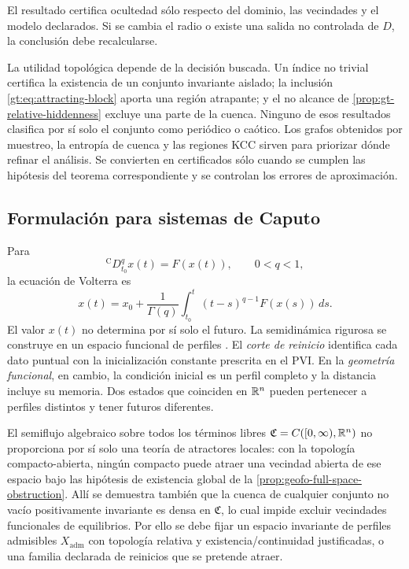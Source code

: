 El resultado certifica ocultedad sólo respecto del dominio, las vecindades y
el modelo declarados. Si se cambia el radio o existe una salida no controlada
de $D$, la conclusión debe recalcularse.

La utilidad topológica depende de la decisión buscada. Un índice no trivial
certifica la existencia de un conjunto invariante aislado; la inclusión
\eqref{gt:eq:attracting-block} aporta una región atrapante; y el no alcance de
\cref{prop:gt-relative-hiddenness} excluye una parte de la cuenca. Ninguno de
esos resultados clasifica por sí solo el conjunto como periódico o caótico.
Los grafos obtenidos por muestreo, la entropía de cuenca y las regiones KCC
sirven para priorizar dónde refinar el análisis. Se convierten en certificados
sólo cuando se cumplen las hipótesis del teorema correspondiente y se controlan
los errores de aproximación.
\fi

\subsection{Formulación para sistemas de Caputo}
\label{subsec:gt-caputo-transfer}

Para
\begin{equation}
 {}^{\mathrm C}D_{t_0}^{q}x(t)=F(x(t)),
 \qquad 0<q<1,
 \label{gt:eq:caputo}
\end{equation}
la ecuación de Volterra es
\begin{equation}
 x(t)=x_0+\frac1{\Gamma(q)}
 \int_{t_0}^{t}(t-s)^{q-1}F(x(s))\,ds.
 \label{gt:eq:caputo-volterra}
\end{equation}
El valor $x(t)$ no determina por sí solo el futuro. La semidinámica rigurosa se
construye en un espacio funcional de perfiles
\cite{CongTuan2017Nonlocal,DoanKloeden2021Semidynamical,
DoanKloeden2024Attractors}. El \emph{corte de reinicio} identifica cada dato puntual con la
inicialización constante prescrita en el PVI. En la \emph{geometría
funcional}, en cambio, la condición inicial es un perfil completo y la
distancia incluye su memoria. Dos estados que coinciden en \(\mathbb{R}^n\) pueden
pertenecer a perfiles distintos y tener futuros diferentes.

El semiflujo algebraico sobre todos los términos libres
$\mathfrak C=C([0,\infty),\mathbb{R}^n)$ no proporciona por sí solo una teoría de
atractores locales: con la topología compacto-abierta, ningún compacto puede
atraer una vecindad abierta de ese espacio bajo las hipótesis de existencia
global de la \cref{prop:geofo-full-space-obstruction}. Allí se demuestra también
que la cuenca de cualquier conjunto no vacío positivamente invariante es
densa en $\mathfrak C$, lo cual impide excluir vecindades funcionales de
equilibrios. Por ello se debe fijar un espacio invariante de perfiles
admisibles $X_{\mathrm{adm}}$ con topología relativa y existencia/continuidad
justificadas, o una familia declarada de reinicios que se pretende atraer.

